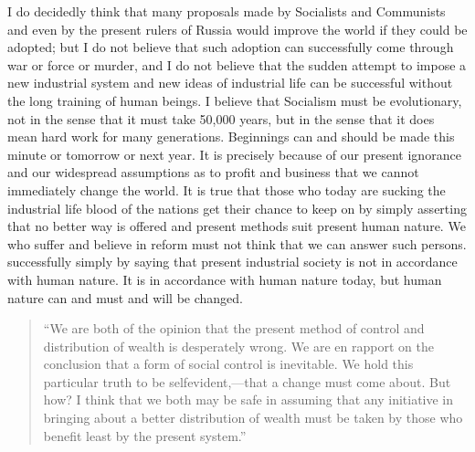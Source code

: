 \documentclass[letterpaper,10pt,english]{jupyterBook}
\begin{document}
\sphinxAtStartPar
I do decidedly think that many proposals made by Socialists and Communists and even by the present rulers of Russia would improve the world if they could be adopted; but I do not believe that such adoption can successfully come through war or force or murder, and I do not believe that the sudden attempt to impose a new industrial system and new ideas of industrial life can be successful without the long training of human beings. I believe that Socialism must be evolutionary, not in the sense that it must take 50,000 years, but in the sense that it does mean hard work for many generations. Beginnings can and should be made this minute or tomorrow or next year. It is precisely because of our present ignorance and our widespread  assumptions as to profit and business that we cannot immediately change the world. It is true that those who today are sucking the industrial life blood of the nations get their chance to keep on by simply asserting that no better way is offered and present methods suit present human nature. We who suffer and believe in reform must not think that we can answer such persons. successfully simply by saying that present industrial society is not in accordance with human nature. It is in accordance with human nature today, but human nature can and must and will be changed.
\begin{quote}

\sphinxAtStartPar
“We are both of the opinion that the present method of control and distribution of wealth is desperately wrong. We are en rapport on the conclusion that a form of social control is inevitable. We hold this particular truth to be self\sphinxhyphen{}evident,—that a change must come about. But how? I think that we both may be safe in assuming that any initiative in bringing about a better distribution of wealth must be taken by those who benefit least by the present system.”
\end{quote}
\end{document}
